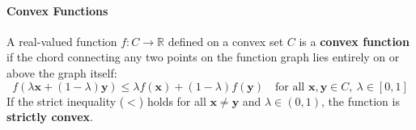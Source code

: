 \paragraph{Convex Functions}
A real-valued function $f: C \to \mathbb{R}$ defined on a convex set $C$ is a \textbf{convex function} if the chord connecting any two points on the function graph lies entirely on or above the graph itself:
\begin{equation}
f(\lambda \mathbf{x} + (1 - \lambda)\mathbf{y}) \le \lambda f(\mathbf{x}) + (1 - \lambda)f(\mathbf{y}) \quad \text{for all } \mathbf{x}, \mathbf{y} \in C, \ \lambda \in [0, 1]\label{eq:convex_function}
\end{equation}
If the strict inequality ($<$) holds for all $\mathbf{x} \ne \mathbf{y}$ and $\lambda \in (0, 1)$, the function is \textbf{strictly convex}.

